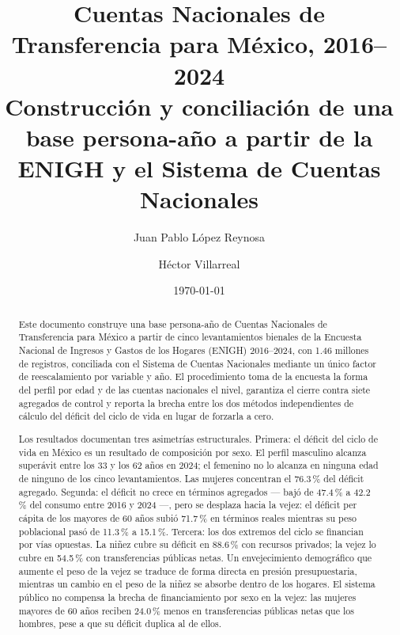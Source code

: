 \documentclass[11pt,a4paper]{article}
\title{\textbf{Cuentas Nacionales de Transferencia para México, 2016--2024}\\[0.3em]
\large Construcción y conciliación de una base persona-año a partir de la ENIGH
y el Sistema de Cuentas Nacionales}
\author{Juan Pablo López Reynosa \and Héctor Villarreal}
\date{\today}
\begin{document}
\maketitle
\begin{abstract}
Este documento construye una base persona-año de Cuentas Nacionales de Transferencia
para México a partir de cinco levantamientos bienales de la Encuesta Nacional de
Ingresos y Gastos de los Hogares (ENIGH) 2016--2024, con 1.46 millones de registros,
conciliada con el Sistema de Cuentas Nacionales mediante un único factor de
reescalamiento por variable y año. El procedimiento toma de la encuesta la forma del
perfil por edad y de las cuentas nacionales el nivel, garantiza el cierre contra siete
agregados de control y reporta la brecha entre los dos métodos independientes de cálculo
del déficit del ciclo de vida en lugar de forzarla a cero.

Los resultados documentan tres asimetrías estructurales. Primera: el déficit del ciclo
de vida en México es un resultado de composición por sexo. El perfil masculino alcanza
superávit entre los 33 y los 62 años en 2024; el femenino no lo alcanza en ninguna edad
de ninguno de los cinco levantamientos. Las mujeres concentran el 76.3\,\% del déficit
agregado. Segunda: el déficit no crece en términos agregados --- bajó de 47.4\,\% a
42.2\,\% del consumo entre 2016 y 2024 ---, pero se desplaza hacia la vejez: el déficit
per cápita de los mayores de 60 años subió 71.7\,\% en términos reales mientras su peso
poblacional pasó de 11.3\,\% a 15.1\,\%. Tercera: los dos extremos del ciclo se
financian por vías opuestas. La niñez cubre su déficit en 88.6\,\% con recursos privados;
la vejez lo cubre en 54.5\,\% con transferencias públicas netas. Un envejecimiento
demográfico que aumente el peso de la vejez se traduce de forma directa en presión
presupuestaria, mientras un cambio en el peso de la niñez se absorbe dentro de los
hogares. El sistema público no compensa la brecha de financiamiento por sexo en la vejez:
las mujeres mayores de 60 años reciben 24.0\,\% menos en transferencias públicas netas
que los hombres, pese a que su déficit duplica al de ellos.
\end{abstract}
\end{document}
